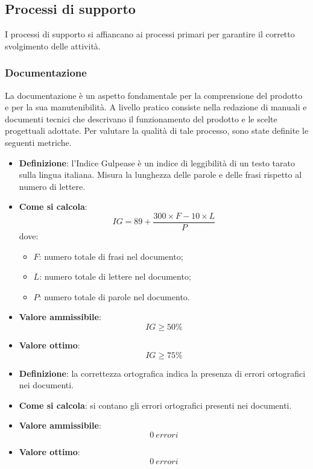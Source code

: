 \subsection{Processi di supporto}
I processi di supporto si affiancano ai processi primari per garantire il corretto svolgimento delle attività.

\subsubsection{Documentazione}
La documentazione è un aspetto fondamentale per la comprensione del prodotto e per la sua manutenibilità. A livello pratico consiste nella redazione di manuali e documenti tecnici che descrivano il funzionamento del prodotto e le scelte progettuali adottate. Per valutare la qualità di tale processo, sono state definite le seguenti metriche.

\hypertarget{19M}{}
\begin{itemize}
	\item \textbf{Definizione}: l'Indice Gulpease è un indice di leggibilità di un testo tarato sulla lingua italiana. Misura la lunghezza delle parole e delle frasi rispetto al numero di lettere.
	\item \textbf{Come si calcola}: \begin{equation*}IG = 89 + \frac{300 \times F - 10 \times L}{P}\end{equation*} dove:
		\begin{itemize}
			\item $F$: numero totale di frasi nel documento;
			\item $L$: numero totale di lettere nel documento;
			\item $P$: numero totale di parole nel documento.
		\end{itemize}
	\item \textbf{Valore ammissibile}: \begin{equation*}IG \geq 50\%\end{equation*}
	\item \textbf{Valore ottimo}: \begin{equation*}IG \geq 75\%\end{equation*}
\end{itemize}

\hypertarget{20M}{}
\begin{itemize}
	\item \textbf{Definizione}: la correttezza ortografica indica la presenza di errori ortografici nei documenti.
	\item \textbf{Come si calcola}: si contano gli errori ortografici presenti nei documenti.
	\item \textbf{Valore ammissibile}: \begin{equation*}0\ errori\end{equation*}
	\item \textbf{Valore ottimo}: \begin{equation*}0\ errori\end{equation*}
\end{itemize}


